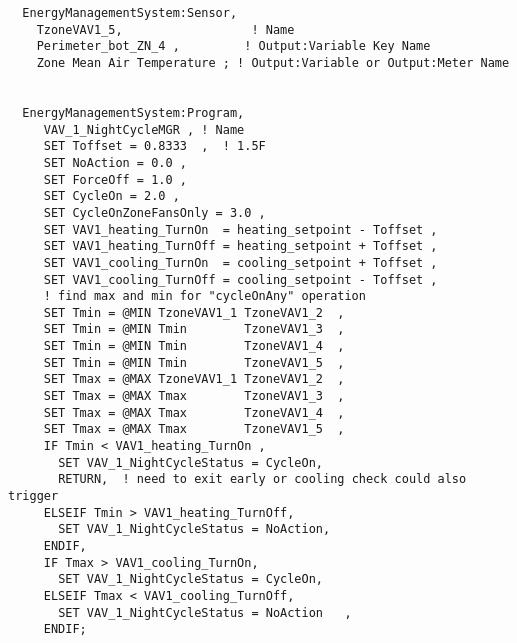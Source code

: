 \begin{lstlisting}
  EnergyManagementSystem:Sensor,
    TzoneVAV1_5,                  ! Name
    Perimeter_bot_ZN_4 ,         ! Output:Variable Key Name
    Zone Mean Air Temperature ; ! Output:Variable or Output:Meter Name


  EnergyManagementSystem:Program,
     VAV_1_NightCycleMGR , ! Name
     SET Toffset = 0.8333  ,  ! 1.5F
     SET NoAction = 0.0 ,
     SET ForceOff = 1.0 ,
     SET CycleOn = 2.0 ,
     SET CycleOnZoneFansOnly = 3.0 ,
     SET VAV1_heating_TurnOn  = heating_setpoint - Toffset ,
     SET VAV1_heating_TurnOff = heating_setpoint + Toffset ,
     SET VAV1_cooling_TurnOn  = cooling_setpoint + Toffset ,
     SET VAV1_cooling_TurnOff = cooling_setpoint - Toffset ,
     ! find max and min for "cycleOnAny" operation
     SET Tmin = @MIN TzoneVAV1_1 TzoneVAV1_2  ,
     SET Tmin = @MIN Tmin        TzoneVAV1_3  ,
     SET Tmin = @MIN Tmin        TzoneVAV1_4  ,
     SET Tmin = @MIN Tmin        TzoneVAV1_5  ,
     SET Tmax = @MAX TzoneVAV1_1 TzoneVAV1_2  ,
     SET Tmax = @MAX Tmax        TzoneVAV1_3  ,
     SET Tmax = @MAX Tmax        TzoneVAV1_4  ,
     SET Tmax = @MAX Tmax        TzoneVAV1_5  ,
     IF Tmin < VAV1_heating_TurnOn ,
       SET VAV_1_NightCycleStatus = CycleOn,
       RETURN,  ! need to exit early or cooling check could also trigger
     ELSEIF Tmin > VAV1_heating_TurnOff,
       SET VAV_1_NightCycleStatus = NoAction,
     ENDIF,
     IF Tmax > VAV1_cooling_TurnOn,
       SET VAV_1_NightCycleStatus = CycleOn,
     ELSEIF Tmax < VAV1_cooling_TurnOff,
       SET VAV_1_NightCycleStatus = NoAction   ,
     ENDIF;
\end{lstlisting}
